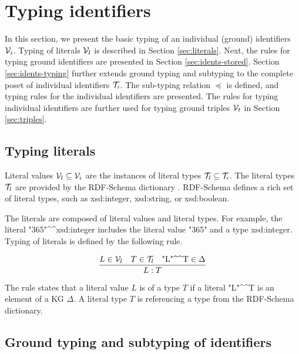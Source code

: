 \documentclass[runningheads]{llncs}
\newcommand{\V}{{\cal V}}
\newcommand{\T}{{\cal T}}
\begin{document}
\section{Typing identifiers\label{sec:typ-idents}}

In this section, we present the basic typing of an individual (ground)
identifiers $\V_i$. Typing of literals $\V_l$ is described in Section
\ref{sec:literals}. Next, the rules for typing ground identifiers are
presented in Section \ref{sec:idents-stored}. Section
\ref{sec:idents-typing} further extends ground typing and subtyping to
the complete poset of individual identifiers $\T_i$. The
sub-typing relation $\preceq$ is defined, and typing rules for the
individual identifiers are presented. The rules for typing individual
identifiers are further used for typing ground triples $\V_t$ in
Section \ref{sec:triples}.





\subsection{Typing literals\label{sec:literals}}

Literal values $\V_l\subseteq\V_i$ are the instances of literal types
$\T_l\subseteq\T_i$. The literal types $\T_l$ are provided by the
RDF-Schema dictionary \cite{rdfschema}. RDF-Schema defines a rich set
of literal types, such as xsd:integer, xsd:string, or xsd:boolean.

The literals are composed of literal values and literal types. For
example, the literal
"365"\textasciicircum\textasciicircum\/xsd:integer includes the
literal value "365" and a type xsd:integer. Typing of literals is
defined by the following rule.

\begin{equation}
\dfrac{L\in\V_l\quad T\in\T_l\quad \text{"L"\textasciicircum\textasciicircum\/T}\in\Delta}
      {L:T}  
\end{equation}

The rule states that a literal value $L$ is of a type $T$ if a literal
"L"\textasciicircum\textasciicircum\/T is an element of a KG
$\Delta$. A literal type $T$ is referencing a type from the RDF-Schema
dictionary.






\subsection{Ground typing and subtyping of identifiers\label{sec:idents-stored}}
\end{document}
